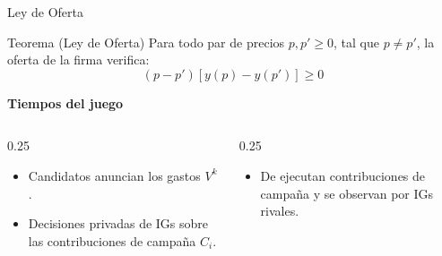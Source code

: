 \documentclass[
  ignorenonframetext,
]{beamer}
\begin{document}
\begin{frame}{Ley de Oferta}
\label{ley-de-oferta}
\begin{block}{Teorema (Ley de Oferta)}
Para todo par de precios \( p, p' \geq 0 \), tal que \( p \neq p' \), la oferta de la firma verifica:
\[
(p - p') [ y(p) - y(p')] \geq 0
\]
\end{block}
\end{frame}

\begin{frame}{}
\label{section-1}
\begin{center}
\textbf{Tiempos del juego}
\end{center}
\begin{center}  %
\end{center}

\begin{columns}
    \begin{column}{0.25\textwidth}
        \begin{itemize}
            \item Candidatos anuncian los gastos  $V^k$.
            \item Decisiones privadas de IGs sobre las contribuciones de campaña $C_i$.
        \end{itemize}
    \end{column}

    \begin{column}{0.25\textwidth}
        \begin{itemize}
            \item De ejecutan contribuciones de campaña y se observan por IGs rivales.
        \end{itemize}
    \end{column}


\end{columns}
\end{frame}
\end{document}
